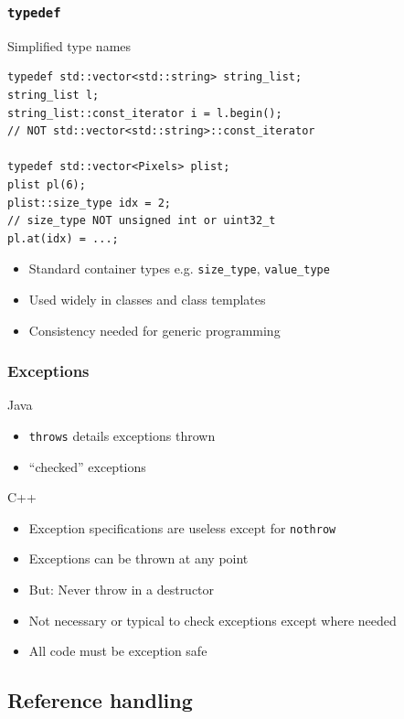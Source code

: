 \documentclass[handout]{beamer}
\begin{document}
\begin{frame}[fragile]
  \frametitle{\texttt{typedef}}
  \begin{block}{Simplified type names}
    \begin{lstlisting}
typedef std::vector<std::string> string_list;
string_list l;
string_list::const_iterator i = l.begin();
// NOT std::vector<std::string>::const_iterator

typedef std::vector<Pixels> plist;
plist pl(6);
plist::size_type idx = 2;
// size_type NOT unsigned int or uint32_t
pl.at(idx) = ...;
\end{lstlisting}
    \begin{itemize}
      \pause
    \item Standard container types e.g. \texttt{size\_type}, \texttt{value\_type}
      \pause
    \item Used widely in classes and class templates
    \item Consistency needed for generic programming
    \end{itemize}
  \end{block}
\end{frame}

\begin{frame}[fragile]
  \frametitle{Exceptions}
  \begin{block}{Java}
    \begin{itemize}
    \item \texttt{throws} details exceptions thrown
    \item “checked” exceptions
    \end{itemize}
  \end{block}
  \begin{block}{C++}
    \begin{itemize}
    \item Exception specifications are useless except for \texttt{nothrow}
      \pause
    \item Exceptions can be thrown at any point
      \pause
    \item But: Never throw in a destructor
      \pause
    \item Not necessary or typical to check exceptions except where needed
      \pause
    \item All code must be exception safe
    \end{itemize}
  \end{block}
\end{frame}

\subsection{Reference handling}
\end{document}
